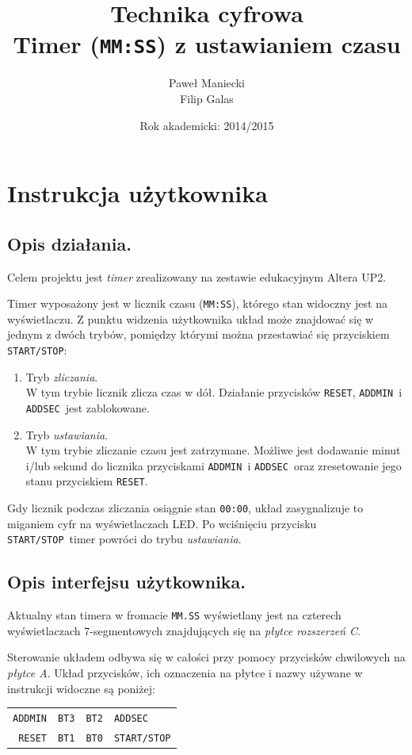 \documentclass[a4paper,oneside]{report}
\title{
	\textbf{Technika cyfrowa}
	\\
	Timer (\texttt{MM:SS}) z ustawianiem czasu
	}
\author{
	Paweł Maniecki\\
	Filip Galas
	}
\date{Rok akademicki: 2014/2015}
\newcommand{\startstop}{\texttt{START/STOP}}
\newcommand{\reset}{\texttt{RESET}}
\newcommand{\addmin}{\texttt{ADD\textunderscore MIN}}
\newcommand{\addsec}{\texttt{ADD\textunderscore SEC}}
\begin{document}
\maketitle

\tableofcontents
\listoffigures

\chapter{Instrukcja użytkownika}
\section{Opis działania.}
Celem projektu jest \emph{timer} zrealizowany na zestawie
edukacyjnym Altera UP2.

Timer wyposażony jest w licznik czasu (\texttt{MM:SS}), którego
stan widoczny jest na wyświetlaczu. Z punktu widzenia użytkownika
układ może znajdować się w jednym z dwóch trybów, pomiędzy którymi
można przestawiać się przyciskiem \startstop :
\begin{enumerate}
\item Tryb \emph{zliczania}.\\
W tym trybie licznik zlicza czas w dół. Działanie przycisków
\reset , \addmin\ i \addsec\ jest zablokowane.
\item Tryb \emph{ustawiania}.\\
W tym trybie zliczanie czasu jest zatrzymane. Możliwe jest
dodawanie minut i/lub sekund do licznika przyciskami \addmin\ i
\addsec\ oraz zresetowanie jego stanu przyciskiem \reset .
\end{enumerate}
Gdy licznik podczas zliczania osiągnie stan \texttt{00:00}, układ
zasygnalizuje to miganiem cyfr na wyświetlaczach LED. Po
wciśnięciu przycisku \startstop\ timer powróci do trybu
\emph{ustawiania}.
\section{Opis interfejsu użytkownika.}
Aktualny stan timera w fromacie \texttt{MM.SS} wyświetlany jest na czterech wyświetlaczach 
7-segmentowych znajdujących się na \emph{płytce rozszerzeń C}. 

Sterowanie układem odbywa się w całości przy pomocy przycisków chwilowych na \emph{płytce A}. 
Układ przycisków, ich oznaczenia na płytce i nazwy używane w instrukcji widoczne są poniżej:
\begin{table}[h] \centering
  \renewcommand{\arraystretch}{2}
  \begin{tabular}{r|c|c|l} \cline{2-3}
  \addmin & \texttt{BT3} & \texttt{BT2} & \addsec    \\ \cline{2-3}
  \reset  & \texttt{BT1} & \texttt{BT0} & \startstop \\ \cline{2-3}
  \end{tabular}
\end{table}
\end{document}
